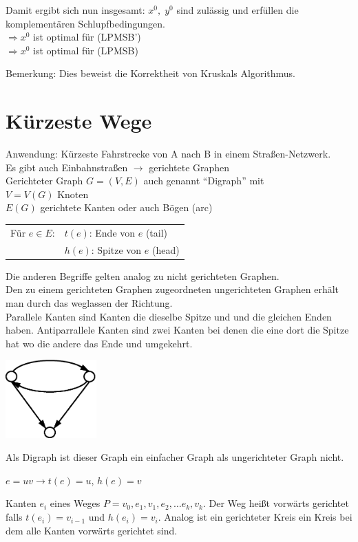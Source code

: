 Damit ergibt sich nun insgesamt: $x^{0},\;y^{0}$ sind zulässig und erfüllen
die komplementären Schlupfbedingungen.\\
$\Rightarrow x^{0}$ ist optimal für (LPMSB')\\
$\Rightarrow x^{0}$ ist optimal für (LPMSB)

Bemerkung: Dies beweist die Korrektheit von Kruskals Algorithmus.

\section{Kürzeste Wege}
Anwendung: Kürzeste Fahrstrecke von A nach B in einem Straßen-Netzwerk.\\
Es gibt auch Einbahnstraßen $\rightarrow$ gerichtete Graphen\\
Gerichteter Graph $G=(V,E)$ auch genannt "`Digraph"' mit \\
$V=V(G)$ Knoten \\
$E(G)$ gerichtete Kanten oder auch Bögen (arc)\\
\begin{tabular}{ll}
Für $e \in E$:& $t(e)$: Ende von $e$ (tail)\\
&$h(e)$: Spitze von $e$ (head)
\end{tabular}
 
Die anderen Begriffe gelten analog zu nicht gerichteten Graphen.\\
Den zu einem gerichteten Graphen zugeordneten ungerichteten Graphen erhält
man durch das weglassen der Richtung.\\
Parallele Kanten sind Kanten die dieselbe Spitze und und die gleichen
Enden haben. Antiparrallele Kanten sind zwei Kanten bei denen die eine dort
die Spitze hat wo die andere das Ende und umgekehrt.

\includegraphics[height=3cm]{bilder/2-2einfachnichte} 

Als Digraph ist dieser Graph ein einfacher Graph als ungerichteter Graph
nicht.

$e=u v \rightarrow t(e)=u$, $h(e) = v$

Kanten $e_{i}$ eines Weges $P= v_{0}, e_{1}, v_{1}, e_{2}, \ldots e_{k},
v_{k}$. Der Weg heißt vorwärts gerichtet falls $t(e_{i})=v_{i-1}$ und
$h(e_{i})=v_{i}$. Analog ist ein gerichteter Kreis ein Kreis bei dem alle
Kanten vorwärts gerichtet sind.

